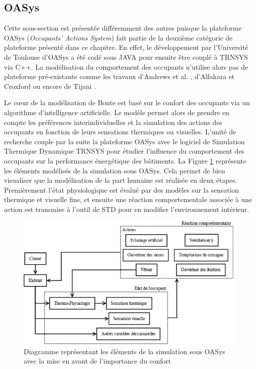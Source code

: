 \subsection{OASys}

Cette sous-section est présentée différemment des autres puisque la plateforme OASys (\textit{Occupants’ Actions System}) fait partie de la deuxième catégorie de plateforme présenté dans ce chapitre. En effet, le développement par l'Université de Toulouse d'OASys a été codé sous JAVA pour ensuite être couplé à TRNSYS via C++. La modélisation du comportement des occupants n'utilise alors pas de plateforme pré-existante comme les travaux d'Andrews et al. \cite{Andrews-11}, d'Alfakara et Croxford \cite{Alfakara-14} ou encore de Tijani \cite{Tijani-14}.

Le cœur de la modélisation de Bonte \cite{Bonte-14} est basé sur le confort des occupants via un algorithme d'intelligence artificielle. Le modèle permet alors de prendre en compte les préférences interindividuelles et la simulation des actions des occupants en fonction de leurs sensations thermiques ou visuelles. L'unité de recherche couple par la suite la plateforme OASys avec le logiciel de Simulation Thermique Dynamique TRNSYS pour étudier l'influence du comportement des occupants sur la performance énergétique des bâtiments. La Figure \ref{fig:Diagramme_OASys} représente les éléments modélisés de la simulation sous OASys. Cela permet de bien visualiser que la modélisation de la part humaine est réalisée en deux étapes. Premièrement l'état physiologique est évalué par des modèles sur la sensation thermique et visuelle fins, et ensuite une réaction comportementale associée à une action est transmise à l'outil de STD pour en modifier l'environnement intérieur.

\begin{figure}[H]
\centering
\includegraphics[scale=0.4]{Images/diagrammes_SMA/OASys}
\caption{Diagramme représentant les éléments de la simulation sous OASys avec la mise en avant de l'importance du confort}
\label{fig:Diagramme_OASys}
\end{figure}

